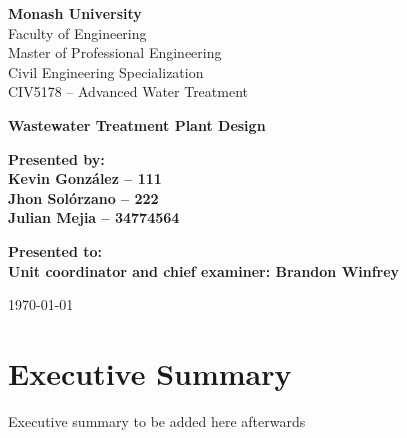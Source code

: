 \documentclass[12pt]{article}
\begin{document}
\pagestyle{empty}

\begin{titlepage}
  \thispagestyle{empty}  %
  
  \begin{flushleft}
  \textbf{Monash University}\\
  Faculty of Engineering\\
  Master of Professional Engineering\\
  Civil Engineering Specialization\\
  CIV5178 – Advanced Water Treatment
  \end{flushleft}
  
  \vspace{2cm}
  
  \begin{center}
      {\Huge \bfseries Wastewater Treatment Plant Design \\[0.5cm]}
  
      \vspace{1.5cm}
  
      {\large \bfseries
      Presented by:\\
      Kevin González – 111\\
      Jhon Solórzano – 222\\
      Julian Mejia – 34774564
      }
  
      \vspace{1cm}
  
      {\large \bfseries
      Presented to:\\
      Unit coordinator and chief examiner: Brandon Winfrey
      }
  \end{center}
  
  \vfill
  
  \begin{center}
      {\normalsize \today}
  \end{center}
  \end{titlepage}
  

\section*{Executive Summary}
Executive summary to be added here afterwards
\newpage


\tableofcontents
\newpage

\pagestyle{fancy}
\end{document}

